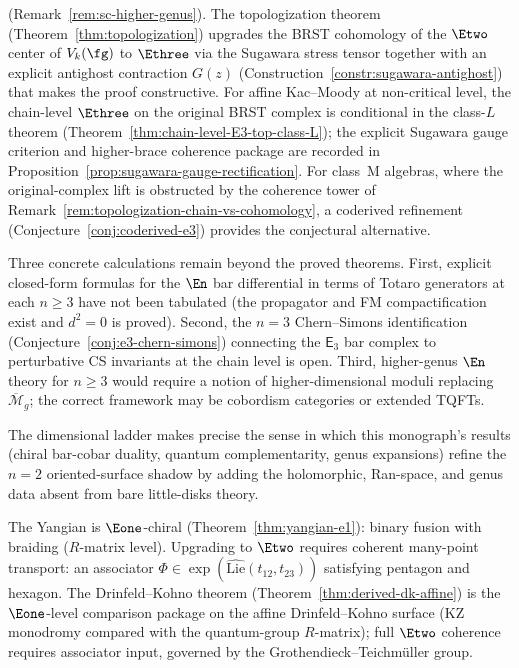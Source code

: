 (Remark~\ref{rem:sc-higher-genus}).
The topologization theorem
(Theorem~\ref{thm:topologization}) upgrades the BRST cohomology of
the $\Etwo$ center of $V_k(\fg)$ to $\Ethree$ via the Sugawara
stress tensor together with an explicit antighost contraction $G(z)$
(Construction~\ref{constr:sugawara-antighost}) that makes
the proof constructive. For affine Kac--Moody at non-critical level,
the chain-level $\Ethree$ on the original BRST complex is
conditional in the class-$L$ theorem
(Theorem~\ref{thm:chain-level-E3-top-class-L}); the explicit
Sugawara gauge criterion and higher-brace coherence package are
recorded in
Proposition~\ref{prop:sugawara-gauge-rectification}. For class~M
algebras, where the original-complex lift is obstructed by the
coherence tower of
Remark~\ref{rem:topologization-chain-vs-cohomology}, a
coderived refinement (Conjecture~\ref{conj:coderived-e3})
provides the conjectural alternative.

Three concrete calculations remain beyond the proved theorems.
First, explicit closed-form formulas for the $\En$ bar differential
in terms of Totaro generators at each $n \geq 3$ have not been
tabulated (the propagator and FM compactification exist and $d^2 = 0$
is proved). Second, the $n = 3$ Chern--Simons identification
(Conjecture~\ref{conj:e3-chern-simons}) connecting the
$\mathsf{E}_3$ bar complex to perturbative CS invariants at the
chain level is open. Third, higher-genus $\En$ theory for $n \geq 3$
would require a notion of higher-dimensional moduli replacing
$\overline{\mathcal{M}}_g$; the correct framework may be cobordism
categories or extended TQFTs.

The dimensional ladder makes precise the sense in which this
monograph's results (chiral bar-cobar duality, quantum
complementarity, genus expansions) refine the $n = 2$
oriented-surface shadow by adding the holomorphic, Ran-space, and
genus data absent from bare little-disks theory.

\begin{remark}
\label{rem:e1-e2-obstruction}
The Yangian is $\Eone$-chiral (Theorem~\ref{thm:yangian-e1}):
binary fusion with braiding ($R$-matrix level). Upgrading to
$\Etwo$ requires coherent many-point transport: an associator
$\Phi \in \exp(\widehat{\mathrm{Lie}}(t_{12}, t_{23}))$
satisfying pentagon and hexagon. The Drinfeld--Kohno theorem
(Theorem~\ref{thm:derived-dk-affine}) is the $\Eone$-level
comparison package on the affine Drinfeld--Kohno surface
(KZ monodromy compared with the quantum-group $R$-matrix); full $\Etwo$ coherence
requires associator input, governed by the
Grothendieck--Teichm\"uller group.
\end{remark}


